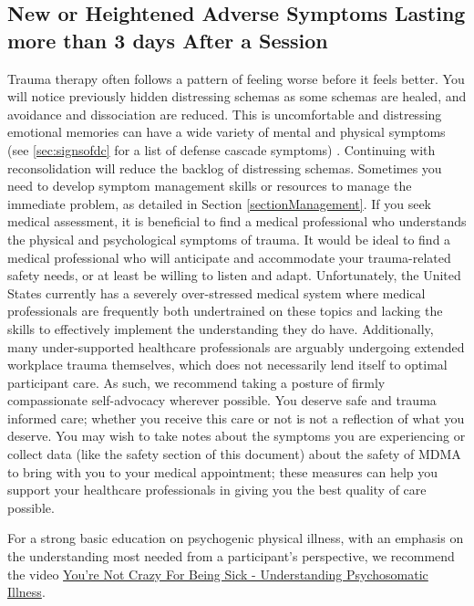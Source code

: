\documentclass[12pt,letterpaper]{book}
\begin{document}
\subsection*{New or Heightened Adverse Symptoms Lasting more than 3 days After a Session}
Trauma therapy often follows a pattern of feeling worse before it feels better. You will notice previously hidden distressing schemas as some schemas are healed, and avoidance and dissociation are reduced. This is uncomfortable and distressing emotional memories can have a wide variety of mental and physical symptoms (see \ref{sec:signsofdc} for a list of defense cascade symptoms) \cite{kroenkeSomatic,henningsenSomatic}. Continuing with reconsolidation will reduce the backlog of distressing schemas. Sometimes you need to develop symptom management skills or resources to manage the immediate problem, as detailed in Section \ref{sectionManagement}. If you seek medical assessment, it is beneficial to find a medical professional who understands the physical and psychological symptoms of trauma. It would be ideal to find a medical professional who will anticipate and accommodate your trauma-related safety needs, or at least be willing to listen and adapt. Unfortunately, the United States currently has a severely over-stressed medical system where medical professionals are frequently both undertrained on these topics and lacking the skills to effectively implement the understanding they do have. Additionally, many under-supported healthcare professionals are arguably undergoing extended workplace trauma themselves, which does not necessarily lend itself to optimal participant care. As such, we recommend taking a posture of firmly compassionate self-advocacy wherever possible. You deserve safe and trauma informed care; whether you receive this care or not is not a reflection of what you deserve. You may wish to take notes about the symptoms you are experiencing or collect data (like the safety section of this document) about the safety of MDMA to bring with you to your medical appointment; these measures can help you support your healthcare professionals in giving you the best quality of care possible.

For a strong basic education on psychogenic physical illness, with an emphasis on the understanding most needed from a participant's perspective, we recommend the video \href{https://www.youtube.com/watch?v=oHoFqwF2OAU}{You're Not Crazy For Being Sick - Understanding Psychosomatic Illness}.
\end{document}
